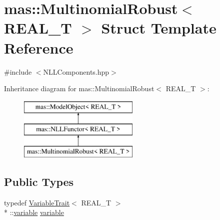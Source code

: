 \hypertarget{structmas_1_1_multinomial_robust}{\section{mas\-:\-:Multinomial\-Robust$<$ R\-E\-A\-L\-\_\-\-T $>$ Struct Template Reference}
\label{structmas_1_1_multinomial_robust}
}


{\ttfamily \#include $<$N\-L\-L\-Components.\-hpp$>$}

Inheritance diagram for mas\-:\-:Multinomial\-Robust$<$ R\-E\-A\-L\-\_\-\-T $>$\-:\begin{figure}[H]
\begin{center}
\leavevmode
\includegraphics[height=3.000000cm]{structmas_1_1_multinomial_robust}
\end{center}
\end{figure}
\subsection*{Public Types}
\begin{DoxyCompactItemize}
\item 
typedef \hyperlink{structmas_1_1_variable_trait}{Variable\-Trait}$<$ R\-E\-A\-L\-\_\-\-T $>$\\*
\-::\hyperlink{structmas_1_1_model_object_a4e62fdbb5826f8fac311262b888ab10a}{variable} \hyperlink{structmas_1_1_multinomial_robust_a99b5fe82b4313d5a8d9b5d2ef7238259}{variable}
\end{DoxyCompactItemize}
